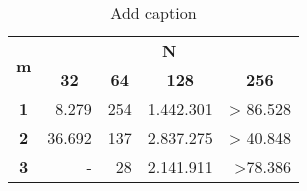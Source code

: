 \begin{table}[htbp]
  \centering
  \caption{Add caption}
    \begin{tabular}{crrrr}
    \multirow{2}[3]{*}{\textbf{m}} & \multicolumn{4}{c}{\textbf{N}} \\
\cmidrule{2-5}      & \multicolumn{1}{c}{\textbf{32}} & \multicolumn{1}{c}{\textbf{64}} & \multicolumn{1}{c}{\textbf{128}} & \multicolumn{1}{c}{\textbf{256}} \\
    \midrule
    \textbf{1} & 8.279 & 254 & 1.442.301 & > 86.528 \\
    \textbf{2} & 36.692 & 137 & 2.837.275 & > 40.848 \\
    \textbf{3} & - & 28 & 2.141.911 & >78.386 \\
    \bottomrule
    \end{tabular}%
  \label{tab:addlabel}%
\end{table}%
